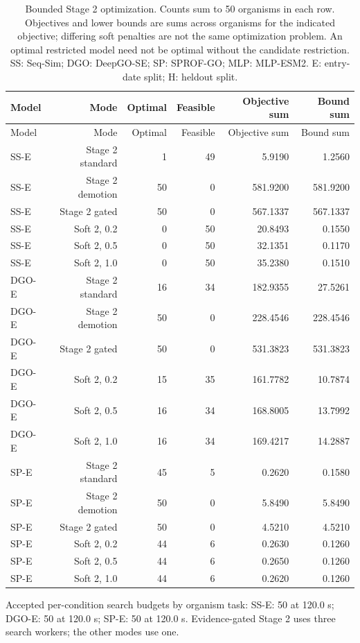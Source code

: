 \begingroup\scriptsize
\setlength{\tabcolsep}{4pt}
\begin{longtable}{lrrrrr}
\caption{Bounded Stage 2 optimization. Counts sum to 50 organisms in each row. Objectives and lower bounds are sums across organisms for the indicated objective; differing soft penalties are not the same optimization problem. An optimal restricted model need not be optimal without the candidate restriction. SS: Seq-Sim; DGO: DeepGO-SE; SP: SPROF-GO; MLP: MLP-ESM2. E: entry-date split; H: heldout split.}\label{tab:supp-solvers}\\
\toprule
Model & Mode & Optimal & Feasible & Objective sum & Bound sum \\
\midrule
\endfirsthead
\toprule
Model & Mode & Optimal & Feasible & Objective sum & Bound sum \\
\midrule
\endhead
SS-E & Stage 2 standard & 1 & 49 & 5.9190 & 1.2560 \\
SS-E & Stage 2 demotion & 50 & 0 & 581.9200 & 581.9200 \\
SS-E & Stage 2 gated & 50 & 0 & 567.1337 & 567.1337 \\
SS-E & Soft 2, 0.2 & 0 & 50 & 20.8493 & 0.1550 \\
SS-E & Soft 2, 0.5 & 0 & 50 & 32.1351 & 0.1170 \\
SS-E & Soft 2, 1.0 & 0 & 50 & 35.2380 & 0.1510 \\
DGO-E & Stage 2 standard & 16 & 34 & 182.9355 & 27.5261 \\
DGO-E & Stage 2 demotion & 50 & 0 & 228.4546 & 228.4546 \\
DGO-E & Stage 2 gated & 50 & 0 & 531.3823 & 531.3823 \\
DGO-E & Soft 2, 0.2 & 15 & 35 & 161.7782 & 10.7874 \\
DGO-E & Soft 2, 0.5 & 16 & 34 & 168.8005 & 13.7992 \\
DGO-E & Soft 2, 1.0 & 16 & 34 & 169.4217 & 14.2887 \\
SP-E & Stage 2 standard & 45 & 5 & 0.2620 & 0.1580 \\
SP-E & Stage 2 demotion & 50 & 0 & 5.8490 & 5.8490 \\
SP-E & Stage 2 gated & 50 & 0 & 4.5210 & 4.5210 \\
SP-E & Soft 2, 0.2 & 44 & 6 & 0.2630 & 0.1260 \\
SP-E & Soft 2, 0.5 & 44 & 6 & 0.2650 & 0.1260 \\
SP-E & Soft 2, 1.0 & 44 & 6 & 0.2620 & 0.1260 \\
\bottomrule
\end{longtable}
\endgroup
\par Accepted per-condition search budgets by organism task: SS-E: 50 at 120.0 s; DGO-E: 50 at 120.0 s; SP-E: 50 at 120.0 s. Evidence-gated Stage 2 uses three search workers; the other modes use one.
